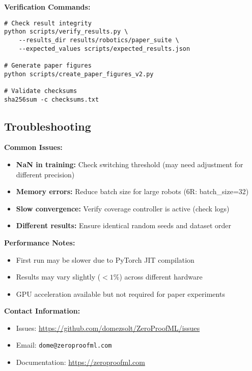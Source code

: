 \documentclass[twoside,11pt]{article}
\begin{document}
\textbf{Verification Commands:}
\begin{verbatim}
# Check result integrity
python scripts/verify_results.py \
    --results_dir results/robotics/paper_suite \
    --expected_values scripts/expected_results.json

# Generate paper figures
python scripts/create_paper_figures_v2.py

# Validate checksums
sha256sum -c checksums.txt
\end{verbatim}

\subsection{Troubleshooting}

\textbf{Common Issues:}
\begin{itemize}
\item \textbf{NaN in training:} Check switching threshold (may need adjustment for different precision)
\item \textbf{Memory errors:} Reduce batch size for large robots (6R: batch\_size=32)
\item \textbf{Slow convergence:} Verify coverage controller is active (check logs)
\item \textbf{Different results:} Ensure identical random seeds and dataset order
\end{itemize}

\textbf{Performance Notes:}
\begin{itemize}
\item First run may be slower due to PyTorch JIT compilation
\item Results may vary slightly ($< 1\%$) across different hardware
\item GPU acceleration available but not required for paper experiments
\end{itemize}

\textbf{Contact Information:}
\begin{itemize}
\item Issues: \url{https://github.com/domezsolt/ZeroProofML/issues}
\item Email: \texttt{dome@zeroproofml.com}
\item Documentation: \url{https://zeroproofml.com}
\end{itemize}
\end{document}
